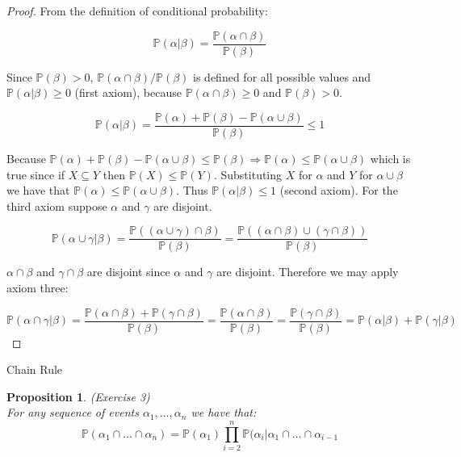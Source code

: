 \documentclass{amsart}
\makeatletter
\def\subsection{\@startsection{subsection}{3}%
  \z@{.5\linespacing\@plus.7\linespacing}{.1\linespacing}%
  {\normalfont\itshape}}
\theoremstyle{plain}
\newtheorem{proposition}{Proposition}
\newcommand{\pr}{\mathbb{P}}
\makeatother
\begin{document}
\begin{proof}
  From the definition of conditional probability:

  \begin{equation*}
    \pr(\alpha|\beta)=\frac{\pr(\alpha\cap\beta)}{\pr(\beta)}
  \end{equation*}

  Since $\pr(\beta)>0$, $\pr(\alpha\cap\beta)/\pr(\beta)$ is defined for all possible values and
  $\pr(\alpha|\beta)\geq0$ (first axiom), because $\pr(\alpha\cap\beta)\geq0$ and $\pr(\beta)>0$.

  \begin{equation*}
    \pr(\alpha|\beta)=\frac{\pr(\alpha)+\pr(\beta)-\pr(\alpha\cup\beta)}{\pr(\beta)}\leq1
  \end{equation*}

  Because $\pr(\alpha)+\pr(\beta)-\pr(\alpha\cup\beta)\leq\pr(\beta)\Rightarrow\pr(\alpha)\leq\pr(
  \alpha\cup\beta)$ which is true since if $X\subseteq Y$ then $\pr(X)\leq\pr(Y)$. Substituting $X$
  for $\alpha$ and $Y$ for $\alpha\cup\beta$ we have that $\pr(\alpha)\leq\pr(\alpha\cup\beta)$.
  Thus $\pr(\alpha|\beta)\leq1$ (second axiom). For the third axiom suppose $\alpha$ and $\gamma$
  are disjoint.

  \begin{equation*}
    \pr(\alpha\cup\gamma|\beta)=\frac{\pr((\alpha\cup\gamma)\cap\beta)}{\pr(\beta)}=\frac{\pr((
      \alpha\cap\beta)\cup(\gamma\cap\beta))}{\pr(\beta)}
  \end{equation*}

  $\alpha\cap\beta$ and $\gamma\cap\beta$ are disjoint since $\alpha$ and $\gamma$ are disjoint.
  Therefore we may apply axiom three:

  \begin{equation*}
    \pr(\alpha\cap\gamma|\beta)=\frac{\pr(\alpha\cap\beta)+\pr(\gamma\cap\beta)}{\pr(\beta)}=
    \frac{\pr(\alpha\cap\beta)}{\pr(\beta)}=\frac{\pr(\gamma\cap\beta)}{\pr(\beta)}=\pr(\alpha|
    \beta)+\pr(\gamma|\beta)
  \end{equation*}
\end{proof}

\subsection{Chain Rule}

\begin{proposition} (Exercise 3)\\
  For any sequence of events $\alpha_1,\ldots,\alpha_n$ we have that:
  \begin{equation*}
    \pr(\alpha_1\cap\ldots\cap\alpha_n)=\pr(\alpha_1)\prod_{i=2}^n\pr(\alpha_i|\alpha_1\cap\ldots
    \cap\alpha_{i-1}
  \end{equation*}
\end{proposition}
\end{document}
